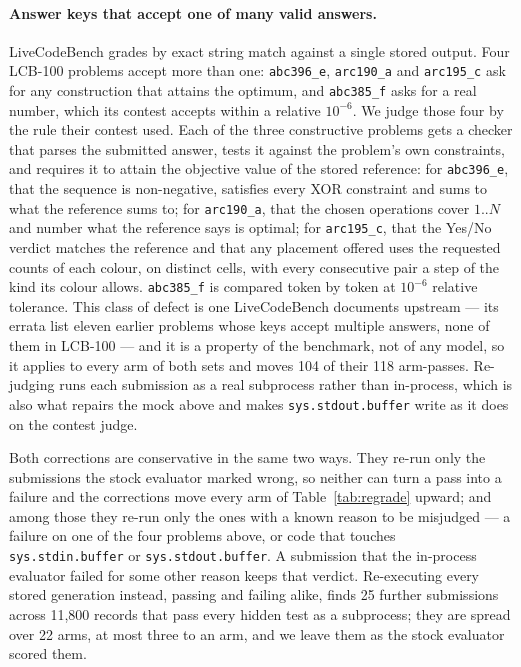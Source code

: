 \documentclass{article}
\begin{document}
\paragraph{Answer keys that accept one of many valid answers.} LiveCodeBench grades by exact
string match against a single stored output. Four LCB-100 problems accept more than one:
\texttt{abc396\_e}, \texttt{arc190\_a} and \texttt{arc195\_c} ask for any construction that
attains the optimum, and \texttt{abc385\_f} asks for a real number, which its contest accepts
within a relative $10^{-6}$. We judge those four by the rule their contest used. Each of the three
constructive problems gets a checker that parses the submitted answer, tests it against the
problem's own constraints, and requires it to attain the objective value of the stored reference:
for \texttt{abc396\_e}, that the sequence is non-negative, satisfies every XOR constraint and sums
to what the reference sums to; for \texttt{arc190\_a}, that the chosen operations cover $1..N$ and
number what the reference says is optimal; for \texttt{arc195\_c}, that the Yes/No verdict matches
the reference and that any placement offered uses the requested counts of each colour, on distinct
cells, with every consecutive pair a step of the kind its colour allows. \texttt{abc385\_f} is
compared token by token at $10^{-6}$ relative tolerance. This class of defect is one LiveCodeBench documents upstream --- its errata
list eleven earlier problems whose keys accept multiple answers, none of them in LCB-100 --- and
it is a property of the benchmark, not of any model, so it applies to every arm of both sets and
moves 104 of their 118 arm-passes. Re-judging
runs each submission as a real subprocess rather than in-process, which is also what repairs the
mock above and makes \texttt{sys.stdout.buffer} write as it does on the contest judge.

Both corrections are conservative in the same two ways. They re-run only the submissions the stock
evaluator marked wrong, so neither can turn a pass into a failure and the corrections move every
arm of Table~\ref{tab:regrade} upward; and among those they re-run only
the ones with a known reason to be misjudged --- a failure on one of the four problems above, or
code that touches \texttt{sys.stdin.buffer} or \texttt{sys.stdout.buffer}. A submission that the
in-process evaluator failed for some other reason keeps that verdict. Re-executing every stored
generation instead, passing and failing alike, finds 25 further submissions across 11{,}800
records that pass every hidden test as a subprocess; they are spread over 22 arms, at most three
to an arm, and we leave them as the stock evaluator scored them.
\end{document}
